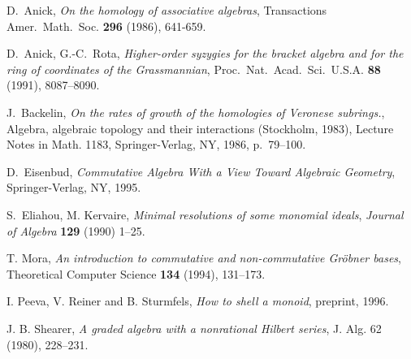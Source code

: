 \documentclass{proc-l}
\theoremstyle{plain}
\theoremstyle{definition}
\begin{document}

\begin{thebibliography}{PRS}

 D.~Anick, {\em On the homology of associative algebras},
Transactions Amer.~Math.~Soc. {\bf 296} (1986), 641-659. 



 D.~Anick, G.-C.~Rota, {\em Higher-order syzygies for the
bracket algebra and for the ring of coordinates of the Grassmannian},
Proc.~Nat.~Acad.~Sci.~U.S.A. {\bf 88} (1991), 8087--8090. 



J.~Backelin, {\em On the rates of growth of the homologies of Veronese subrings.}, Algebra, algebraic topology
and their interactions (Stockholm, 1983),  
Lecture Notes in Math. 1183, Springer-Verlag, NY, 1986, p.~79--100.



 D.~Eisenbud, {\em Commutative Algebra With a View Toward
Algebraic Geometry}, Springer-Verlag, NY, 1995. 



 S.~Eliahou, M. Kervaire, {\em Minimal resolutions of some
monomial ideals}, {\sl Journal of Algebra} {\bf 129} (1990) 1--25.



 T. Mora, {\em An introduction to commutative and
non-commutative Gr\"{o}bner bases}, Theoretical Computer Science {\bf 134}
(1994), 131--173. \pagebreak



 I. Peeva, V. Reiner and B. Sturmfels, {\em How to shell a
monoid}, preprint, 1996.



J. B. Shearer, {\em A graded algebra with a nonrational Hilbert series}, J.
Alg. 62 (1980), 228--231. 
\end{thebibliography}
\end{document}
